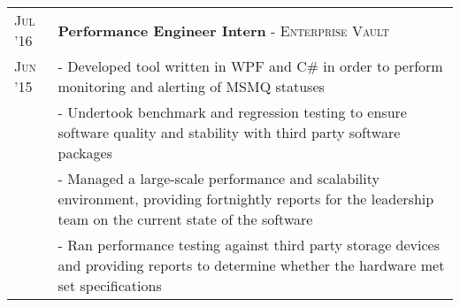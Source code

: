 \documentclass[a4paper,10pt]{extarticle} %
\begin{document}
{\begin{tabularx}{\linewidth}{ l | X }
\textsc{Jul '16} & \textbf{Performance Engineer Intern} \textsc{- Enterprise Vault}\hfill\\
\textsc{Jun '15}
& {- Developed tool written in WPF and C\# in order to perform monitoring and alerting of MSMQ statuses}\\
& {- Undertook benchmark and regression testing to ensure software quality and stability with third party software packages}\\
& {- Managed a large-scale performance and scalability environment, providing fortnightly reports for the leadership team on the current state of the software}\\
& {- Ran performance testing against third party storage devices and providing reports to determine whether the hardware met set specifications}\\


\end{tabularx}




}
\end{document}
